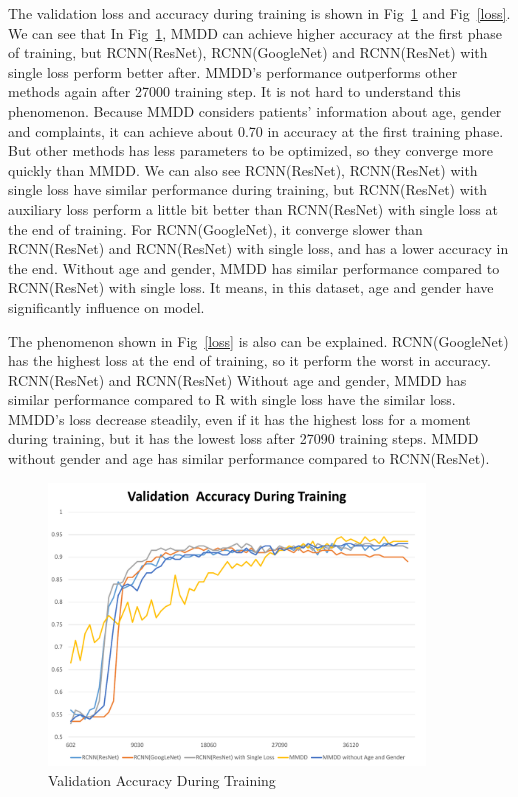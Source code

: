 \documentclass[runningheads]{llncs}
\begin{document}
The validation loss and accuracy during training is shown in Fig~\ref{aac} and Fig~\ref{loss}. We can see that In Fig~\ref{aac}, MMDD can achieve higher accuracy at the first phase of training, but RCNN(ResNet), RCNN(GoogleNet) and RCNN(ResNet) with single loss perform better after. MMDD's performance outperforms other methods again after 27000 training step. It is not hard to understand this phenomenon. Because MMDD considers patients' information about age, gender and complaints, it can achieve about 0.70 in accuracy at the first training phase. But other methods has less parameters to be optimized, so they converge more quickly than MMDD. We can also see RCNN(ResNet), RCNN(ResNet) with single loss have similar performance during training, but RCNN(ResNet) with auxiliary loss perform a little bit better than RCNN(ResNet) with single loss at the end of training. For RCNN(GoogleNet), it converge slower than RCNN(ResNet) and RCNN(ResNet) with single loss, and has a lower accuracy in the end. Without age and gender, MMDD has similar performance compared to RCNN(ResNet) with single loss. It means, in this dataset, age and gender have significantly influence on model.

The phenomenon shown in Fig~\ref{loss} is also can be explained. RCNN(GoogleNet) has the highest loss at the end of training, so it perform the worst in accuracy. RCNN(ResNet) and RCNN(ResNet) Without age and gender, MMDD has similar performance compared to R with single loss have the similar loss. MMDD's loss decrease steadily, even if it has the highest loss for a moment during training, but it has the lowest loss after 27090 training steps. 
MMDD without gender and age has similar performance compared to RCNN(ResNet).

\begin{figure}[htb]
    \centerline{\includegraphics[width=100mm]{aac.pdf}}
    \vspace{-0cm}
    \caption{Validation Accuracy During Training}
    \vspace{-0cm}
    \label{aac}
    \end{figure}
\end{document}

